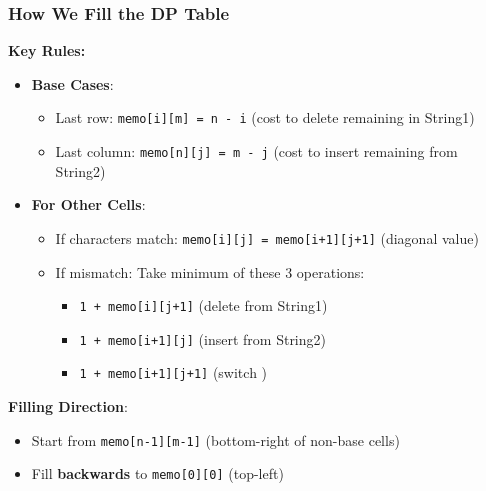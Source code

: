 \documentclass[10pt,aspectratio=43]{beamer}
\begin{document}
\begin{frame}
    \frametitle{How We Fill the DP Table}
    
    \textbf{Key Rules:}
    \begin{itemize}
        \item \textcolor{myMaroon}{\textbf{Base Cases}}:
        \begin{itemize}
            \item Last row: \texttt{memo[i][m] = n - i} (cost to delete remaining in String1)
            \item Last column: \texttt{memo[n][j] = m - j} (cost to insert remaining from String2)
        \end{itemize}
        
        \item \textcolor{myMaroon}{\textbf{For Other Cells}}:
        \begin{itemize}
            \item If characters match: \texttt{memo[i][j] = memo[i+1][j+1]} (diagonal value)
            \item If mismatch: Take minimum of these 3 operations:
            \begin{itemize}
                \item \texttt{1 + memo[i][j+1]} (delete from String1)
                \item \texttt{1 + memo[i+1][j]} (insert from String2)
                \item \texttt{1 + memo[i+1][j+1]} (switch )
            \end{itemize}
        \end{itemize}
    \end{itemize}

    \vspace{0.3cm}
    \textbf{Filling Direction}:
    \begin{itemize}
        \item Start from \texttt{memo[n-1][m-1]} (bottom-right of non-base cells)
        \item Fill \textbf{backwards} to \texttt{memo[0][0]} (top-left)
    \end{itemize}

\end{frame}
\end{document}
